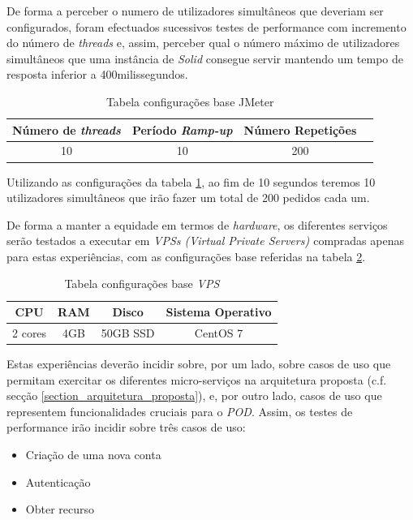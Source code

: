 De forma a perceber o numero de utilizadores simultâneos que deveriam ser configurados, foram efectuados sucessivos testes de performance com incremento do número de \emph{threads} e, assim, perceber qual o número máximo de utilizadores simultâneos que uma instância de \emph{Solid} consegue servir mantendo um tempo de resposta inferior a 400milissegundos.

\begin{table}[h]
\centering
\caption{Tabela configurações base JMeter}
\vspace{0.5cm}
\label{jmeter_configs}
\begin{tabular}{c|c|c|c} 
 Número de \emph{threads} & Período \emph{Ramp-up} & Número Repetições \\
\hline                          
10 & 10 & 200 \\
\end{tabular}
\end{table}

Utilizando as configurações da tabela \ref{jmeter_configs}, ao fim de 10 segundos teremos 10 utilizadores simultâneos que irão fazer um total de 200 pedidos cada um.

De forma a manter a equidade em termos de \emph{hardware}, os diferentes serviços serão testados a executar em \emph{VPSs (Virtual Private Servers) \label{sym:vps}} compradas apenas para estas experiências, com as configurações base referidas na tabela \ref{vps_configs}.

\begin{table}[h]
\centering
\caption{Tabela configurações base \emph{VPS}}
\vspace{0.5cm}
\label{vps_configs}
\begin{tabular}{c|c|c|c|} 
CPU & RAM & Disco & Sistema Operativo \\
\hline                          
2 cores & 4GB & 50GB SSD & CentOS 7 \\
\end{tabular}
\end{table}

Estas experiências deverão incidir sobre, por um lado, sobre casos de uso que permitam exercitar os diferentes micro-serviços na arquitetura proposta ({c.f.} secção \ref{section_arquitetura_proposta}), e, por outro lado, casos de uso que representem funcionalidades cruciais para o \emph{POD}. Assim, os testes de performance irão incidir sobre três casos de uso:
\begin{itemize}
    \item Criação de uma nova conta
    \item Autenticação
    \item Obter recurso
\end{itemize}

